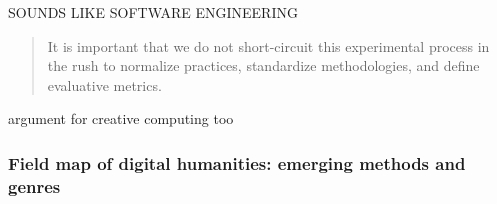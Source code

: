 \begin{draft}
  \begin{draft}
    SOUNDS LIKE SOFTWARE ENGINEERING
  \end{draft}

  \begin{quote}
    It is important that we do not short-circuit this experimental process in the rush to normalize practices, standardize methodologies, and define evaluative metrics. \autocite[p.21]{Burdick2012}
  \end{quote}

  \begin{draft}
    argument for creative computing too
  \end{draft}

  \subsubsection*{Field map of digital humanities: emerging methods and genres}\autocite[p.29-60]{Burdick2012}


\end{draft}
